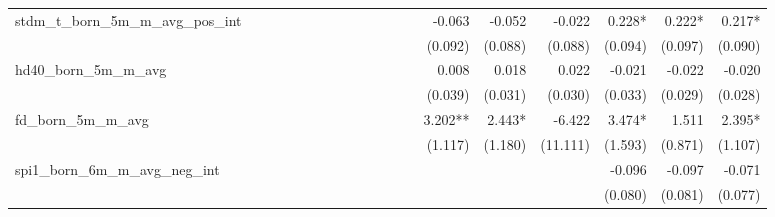 \begin{tabular}{lrrrrrrrrrrrrrrrrrr}
stdm\_t\_born\_5m\_m\_avg\_pos\_int         &             &             &             &             &             &             &             &             &             &             &             &             &      -0.063 &      -0.052 &      -0.022 &      0.228* &      0.222* &      0.217* \\ 
                                            &             &             &             &             &             &             &             &             &             &             &             &             &     (0.092) &     (0.088) &     (0.088) &     (0.094) &     (0.097) &     (0.090) \\ 
hd40\_born\_5m\_m\_avg                      &             &             &             &             &             &             &             &             &             &             &             &             &       0.008 &       0.018 &       0.022 &      -0.021 &      -0.022 &      -0.020 \\ 
                                            &             &             &             &             &             &             &             &             &             &             &             &             &     (0.039) &     (0.031) &     (0.030) &     (0.033) &     (0.029) &     (0.028) \\ 
fd\_born\_5m\_m\_avg                        &             &             &             &             &             &             &             &             &             &             &             &             &     3.202** &      2.443* &      -6.422 &      3.474* &       1.511 &      2.395* \\ 
                                            &             &             &             &             &             &             &             &             &             &             &             &             &     (1.117) &     (1.180) &    (11.111) &     (1.593) &     (0.871) &     (1.107) \\ 
spi1\_born\_6m\_m\_avg\_neg\_int            &             &             &             &             &             &             &             &             &             &             &             &             &             &             &             &      -0.096 &      -0.097 &      -0.071 \\ 
                                            &             &             &             &             &             &             &             &             &             &             &             &             &             &             &             &     (0.080) &     (0.081) &     (0.077) \\ 

\end{tabular}

